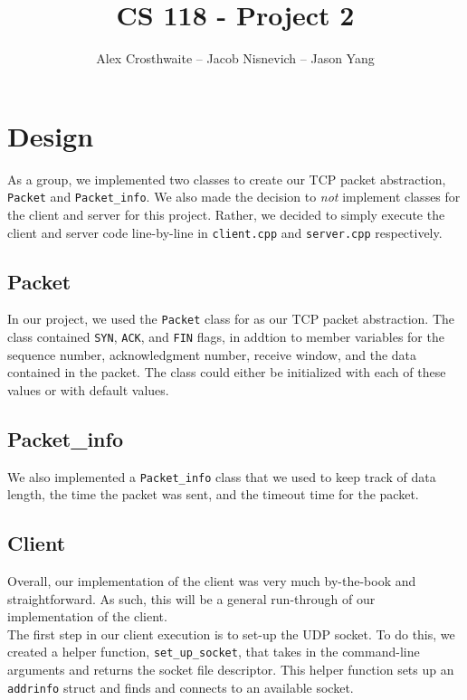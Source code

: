 \documentclass{article}
\begin{document}
\title{CS 118 - Project 2}
\author{Alex Crosthwaite -- Jacob Nisnevich -- Jason Yang}

\maketitle

\section{Design}

As a group, we implemented two classes to create our TCP packet abstraction, \texttt{Packet} and \texttt{Packet\_info}. We also made the decision to \textit{not} implement classes for the client and server for this project. Rather, we decided to simply execute the client and server code line-by-line in \texttt{client.cpp} and \texttt{server.cpp} respectively.

\subsection{Packet}

In our project, we used the \texttt{Packet} class for as our TCP packet abstraction. The class contained \texttt{SYN}, \texttt{ACK}, and \texttt{FIN} flags, in addtion to member variables for the sequence number, acknowledgment number, receive window, and the data contained in the packet. The class could either be initialized with each of these values or with default values.

\subsection{Packet\_info}

We also implemented a \texttt{Packet\_info} class that we used to keep track of data length, the time the packet was sent, and the timeout time for the packet.

\subsection{Client}

Overall, our implementation of the client was very much by-the-book and straightforward. As such, this will be a general run-through of our implementation of the client. \\

\noindent
The first step in our client execution is to set-up the UDP socket. To do this, we created a helper function, \texttt{set\_up\_socket}, that takes in the command-line arguments and returns the socket file descriptor. This helper function sets up an \texttt{addrinfo} struct and finds and connects to an available socket. \\
\end{document}
